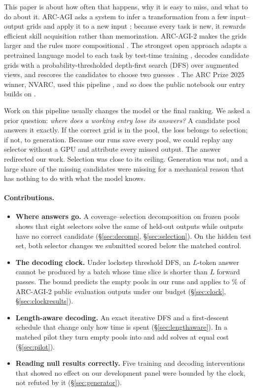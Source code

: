 \documentclass[10pt,twocolumn]{article}
\theoremstyle{plain}\newtheorem{proposition}{Proposition}
\theoremstyle{definition}\newtheorem{corollary}{Corollary}
\begin{document}
This paper is about how often that happens, why it is easy to miss, and what to do about it. ARC-AGI asks a system to infer a transformation from a few input--output grids and apply it to a new input \citep{chollet2019}; because every task is new, it rewards efficient skill acquisition rather than memorization. ARC-AGI-2 makes the grids larger and the rules more compositional \citep{chollet2025}. The strongest open approach adapts a pretrained language model to each task by test-time training \citep{akyurek2024,cole2025}, decodes candidate grids with a probability-thresholded depth-first search (DFS) over augmented views, and rescores the candidates to choose two guesses \citep{franzen2025}. The ARC Prize 2025 winner, NVARC, used this pipeline \citep{sorokin2025}, and so does the public notebook our entry builds on \citep{rudra2026}.

Work on this pipeline usually changes the model or the final ranking. We asked a prior question: \emph{where does a working entry lose its answers?} A candidate pool answers it exactly. If the correct grid is in the pool, the loss belongs to selection; if not, to generation. Because our runs save every pool, we could replay any selector without a GPU and attribute every missed output. The answer redirected our work. Selection was close to its ceiling. Generation was not, and a large share of the missing candidates were missing for a mechanical reason that has nothing to do with what the model knows.

\paragraph{Contributions.}
\begin{itemize}[leftmargin=*,itemsep=1pt,topsep=2pt,parsep=0pt]
\item \textbf{Where answers go.} A coverage--selection decomposition on frozen pools shows that eight selectors solve the same \ConfSolved{} of \ConfOutputs{} held-out outputs while \ConfNoCorrect{} outputs have no correct candidate (\S\ref{sec:decomp}, \S\ref{sec:selection}). On the hidden test set, both selector changes we submitted scored below the matched control.
\item \textbf{The decoding clock.} Under lockstep threshold DFS, an $L$-token answer cannot be produced by a batch whose time slice is shorter than $L$ forward passes. The bound predicts the empty pools in our runs and applies to \EvalUnreachPct\% of ARC-AGI-2 public evaluation outputs under our budget (\S\ref{sec:clock}, \S\ref{sec:clockresults}).
\item \textbf{Length-aware decoding.} An exact iterative DFS and a first-descent schedule that change only how time is spent (\S\ref{sec:lengthaware}). In a matched pilot they turn \PilotEmptyCtl{} empty pools into \PilotEmptyLA{} and add \PilotSolvedLA{} solves at equal cost (\S\ref{sec:pilot}).
\item \textbf{Reading null results correctly.} Five training and decoding interventions that showed no effect on our development panel were bounded by the clock, not refuted by it (\S\ref{sec:generator}).
\end{itemize}
\end{document}
